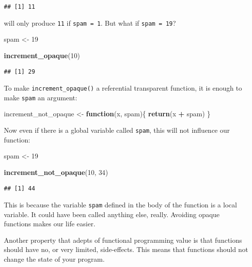 \documentclass[]{gitbook}
\newenvironment{Shaded}{\begin{snugshade}}{\end{snugshade}}
\newcommand{\ControlFlowTok}[1]{\textcolor[rgb]{0.13,0.29,0.53}{\textbf{#1}}}
\newcommand{\DecValTok}[1]{\textcolor[rgb]{0.00,0.00,0.81}{#1}}
\newcommand{\KeywordTok}[1]{\textcolor[rgb]{0.13,0.29,0.53}{\textbf{#1}}}
\newcommand{\NormalTok}[1]{#1}
\newcommand{\OperatorTok}[1]{\textcolor[rgb]{0.81,0.36,0.00}{\textbf{#1}}}
\newcommand{\StringTok}[1]{\textcolor[rgb]{0.31,0.60,0.02}{#1}}
\theoremstyle{definition}
\theoremstyle{definition}
\theoremstyle{definition}
\theoremstyle{remark}
\begin{document}
\begin{verbatim}
## [1] 11
\end{verbatim}

will only produce \texttt{11} if \texttt{spam\ =\ 1}. But what if
\texttt{spam\ =\ 19}?

\begin{Shaded}
\begin{Highlighting}[]
\NormalTok{spam <-}\StringTok{ }\DecValTok{19}

\KeywordTok{increment_opaque}\NormalTok{(}\DecValTok{10}\NormalTok{)}
\end{Highlighting}
\end{Shaded}

\begin{verbatim}
## [1] 29
\end{verbatim}

To make \texttt{increment\_opaque()} a referential transparent function,
it is enough to make \texttt{spam} an argument:

\begin{Shaded}
\begin{Highlighting}[]
\NormalTok{increment_not_opaque <-}\StringTok{ }\ControlFlowTok{function}\NormalTok{(x, spam)\{}
    \KeywordTok{return}\NormalTok{(x }\OperatorTok{+}\StringTok{ }\NormalTok{spam)}
\NormalTok{\}}
\end{Highlighting}
\end{Shaded}

Now even if there is a global variable called \texttt{spam}, this will
not influence our function:

\begin{Shaded}
\begin{Highlighting}[]
\NormalTok{spam <-}\StringTok{ }\DecValTok{19}

\KeywordTok{increment_not_opaque}\NormalTok{(}\DecValTok{10}\NormalTok{, }\DecValTok{34}\NormalTok{)}
\end{Highlighting}
\end{Shaded}

\begin{verbatim}
## [1] 44
\end{verbatim}

This is because the variable \texttt{spam} defined in the body of the
function is a local variable. It could have been called anything else,
really. Avoiding opaque functions makes our life easier.

Another property that adepts of functional programming value is that
functions should have no, or very limited, side-effects. This means that
functions should not change the state of your program.
\end{document}
